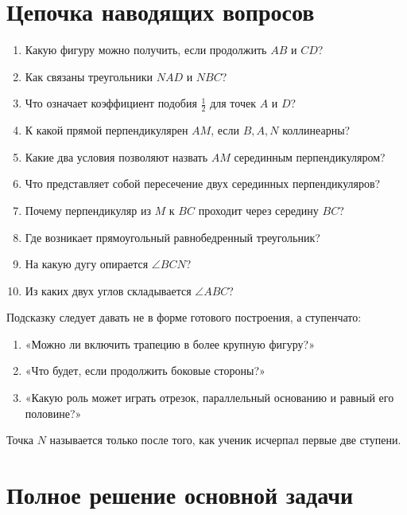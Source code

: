 \section{Цепочка наводящих вопросов}

\begin{enumerate}
  \item Какую фигуру можно получить, если продолжить \(AB\) и \(CD\)?
  \item Как связаны треугольники \(NAD\) и \(NBC\)?
  \item Что означает коэффициент подобия \(\frac12\) для точек \(A\) и \(D\)?
  \item К какой прямой перпендикулярен \(AM\), если \(B,A,N\) коллинеарны?
  \item Какие два условия позволяют назвать \(AM\) серединным
  перпендикуляром?
  \item Что представляет собой пересечение двух серединных перпендикуляров?
  \item Почему перпендикуляр из \(M\) к \(BC\) проходит через середину \(BC\)?
  \item Где возникает прямоугольный равнобедренный треугольник?
  \item На какую дугу опирается \(\angle BCN\)?
  \item Из каких двух углов складывается \(\angle ABC\)?
\end{enumerate}

\begin{teacherbox}
Подсказку следует давать не в форме готового построения, а ступенчато:

\begin{enumerate}
  \item «Можно ли включить трапецию в более крупную фигуру?»
  \item «Что будет, если продолжить боковые стороны?»
  \item «Какую роль может играть отрезок, параллельный основанию и равный его
  половине?»
\end{enumerate}

Точка \(N\) называется только после того, как ученик исчерпал первые две
ступени.
\end{teacherbox}

\newpage
\section{Полное решение основной задачи}

